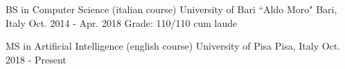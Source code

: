 

\begin{cventries}

  \cventry
    {BS in Computer Science (italian course)} %
    {University of Bari ``Aldo Moro"} %
    {Bari, Italy} %
    {Oct. 2014 - Apr. 2018} %
    {Grade: 110/110 cum laude}
    
  \cventry
    {MS in Artificial Intelligence (english course)} %
    {University of Pisa} %
    {Pisa, Italy} %
    {Oct. 2018 - Present} %
    {}

\end{cventries}
